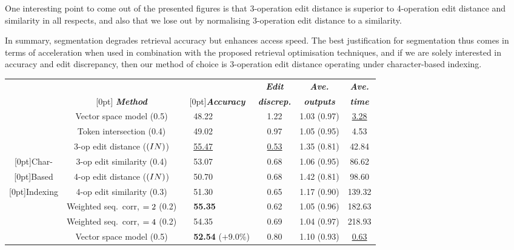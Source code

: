 One interesting point to come out of the presented figures is that
3-operation edit distance is superior to 4-operation edit distance and
similarity in all respects, and also that we lose out by normalising
3-operation edit distance to a similarity. 

In summary, segmentation degrades retrieval accuracy but enhances access
speed. The best justification for segmentation thus comes in terms of
acceleration when used in combination with the proposed retrieval
optimisation techniques, and if we are solely interested in accuracy and
edit discrepancy, then our method of choice is 3-operation edit distance
operating under character-based indexing.


\begin{table*}[htbp]
  \begin{center}
  \small
    \begin{tabular}{|c|c|cl|c|c|c|}
      \cline{2-7}
      \multicolumn{1}{c|}{} & & \multicolumn{2}{c|}{}
      & {\bf \it Edit} & {\bf \it Ave.} & {\bf \it Ave.} \\
      \multicolumn{1}{c|}{} & \raisebox{1.5ex}[0pt]{{\bf \it
          Method}} &
      \multicolumn{2}{c|}{\raisebox{1.5ex}[0pt]{{\bf \it Accuracy}}}
      & {\bf \it discrep.} & {\bf \it outputs} &
      {\bf \it time} \\
      \hline
      & Vector space model (0.5) & & 48.22 & 1.22 & 1.03 (0.97) & \ul{3.28} \\
      & Token intersection (0.4) & & 49.02 & 0.97 & 1.05 (0.95) & 4.53 \\
      \cline{2-7}
      & 3-op edit distance ($(IN)$) & & \ul{55.47} & \ul{0.53} & 1.35 (0.81) & 42.84 \\
      \raisebox{1.5ex}[0pt]{\sc Char-} & 3-op edit similarity (0.4) & & 53.07 & 0.68 & 1.06 (0.95) & 86.62 \\
      \raisebox{1.5ex}[0pt]{\sc Based} & 4-op edit distance ($(IN)$) & & 50.70 & 0.68 & 1.42 (0.81) & 98.60 \\
      \raisebox{1.5ex}[0pt]{\sc Indexing} & 4-op edit similarity (0.3) & & 51.30 & 0.65 & 1.17 (0.90) & 139.32 \\
      & Weighted seq.\ corr, $=2$ (0.2) & & {\bf 55.35} & 0.62 & 1.05 (0.96) & 182.63 \\
      & Weighted seq.\ corr, $=4$ (0.2) & & 54.35 & 0.69 & 1.04 (0.97) & 218.93 \\
      \hline\hline
      & Vector space model (0.5) & & {\bf 52.54} ($+$9.0\%) & 0.80 & 1.10 (0.93) & \ul{0.63} \\

\end{tabular}
\end{center}
\end{table*}
